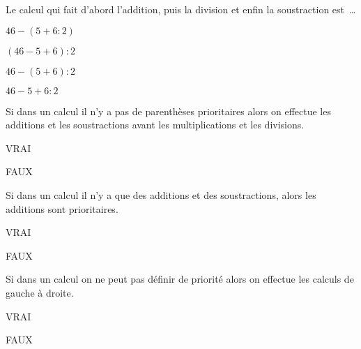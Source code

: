 \begin{QCM}
\begin{GroupeQCM}
\begin{exercice}
      Le calcul qui fait d'abord  l'addition, puis la division et enfin la soustraction est \ldots
      \begin{ChoixQCM}{4}
      \item $46 - (5 + 6 : 2)$
      \item $(46 - 5 + 6) : 2$
      \item $46 - (5 + 6) : 2$
      \item $46 - 5 + 6 : 2$
      \end{ChoixQCM}
\begin{corrige}
   \end{corrige}
    \end{exercice}
    
\begin{exercice}
      Si dans un calcul il n'y a pas de parenthèses prioritaires alors on effectue les additions et les soustractions avant les multiplications et les divisions.
      \begin{ChoixQCM}{2}
      \item VRAI
      \item FAUX
      \end{ChoixQCM}
\begin{corrige}
   \end{corrige}
    \end{exercice}
    
\begin{exercice}
      Si dans un calcul il n'y a que des additions et des soustractions, alors les additions sont prioritaires.
      \begin{ChoixQCM}{2}
      \item VRAI
      \item FAUX
      \end{ChoixQCM}
\begin{corrige}
   \end{corrige}
    \end{exercice}
    
\begin{exercice}
      Si dans un calcul on ne peut pas définir de priorité alors on effectue les calculs de gauche à droite.
      \begin{ChoixQCM}{2}
      \item VRAI
      \item FAUX
      \end{ChoixQCM}
\begin{corrige}
   \end{corrige}
    \end{exercice}

\end{GroupeQCM}
\end{QCM}

  